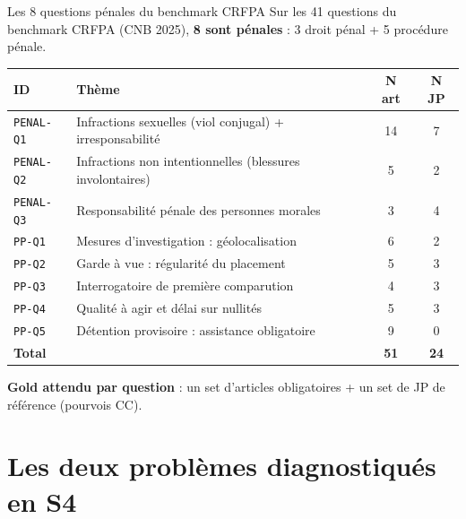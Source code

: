 \documentclass[aspectratio=169,10pt]{beamer}
\begin{document}
\begin{frame}{Les 8 questions pénales du benchmark CRFPA}
  \footnotesize
  Sur les 41 questions du benchmark CRFPA (CNB 2025), \textbf{8 sont pénales} :
  3 droit pénal + 5 procédure pénale.

  \vspace{0.4em}
  \renewcommand{\arraystretch}{1.2}
  \begin{center}
  \begin{tabular}{@{}l p{6.8cm} c c@{}}
    \toprule
    \textbf{ID} & \textbf{Thème} & \textbf{N art} & \textbf{N JP} \\
    \midrule
    \texttt{PENAL-Q1} & Infractions sexuelles (viol conjugal) + irresponsabilité          & 14 & 7 \\
    \texttt{PENAL-Q2} & Infractions non intentionnelles (blessures involontaires)         &  5 & 2 \\
    \texttt{PENAL-Q3} & Responsabilité pénale des personnes morales                       &  3 & 4 \\
    \texttt{PP-Q1}    & Mesures d'investigation : géolocalisation                         &  6 & 2 \\
    \texttt{PP-Q2}    & Garde à vue : régularité du placement                             &  5 & 3 \\
    \texttt{PP-Q3}    & Interrogatoire de première comparution                            &  4 & 3 \\
    \texttt{PP-Q4}    & Qualité à agir et délai sur nullités                              &  5 & 3 \\
    \texttt{PP-Q5}    & Détention provisoire : assistance obligatoire                     &  9 & 0 \\
    \midrule
    \textbf{Total} & & \textbf{51} & \textbf{24} \\
    \bottomrule
  \end{tabular}
  \end{center}

  \vspace{0.4em}
  \textbf{Gold attendu par question} : un set d'articles obligatoires +
  un set de JP de référence (pourvois CC).
\end{frame}

\section{Les deux problèmes diagnostiqués en S4}
\end{document}
